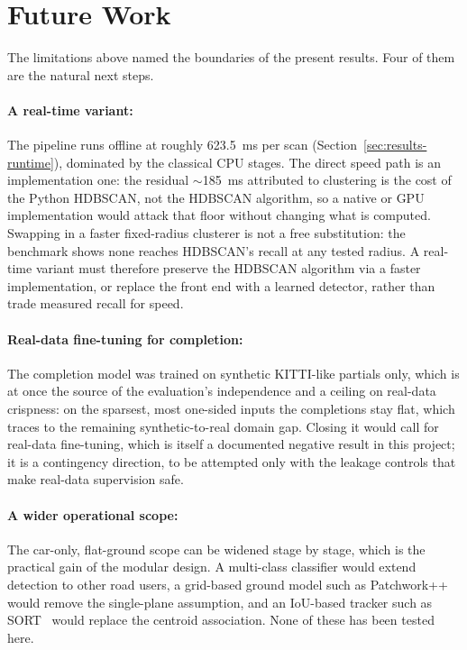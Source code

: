 \section{Future Work}
\label{sec:conclusion-future}

The limitations above named the boundaries of the present results. Four of them are the natural next
steps.

\paragraph{A real-time variant:} The pipeline runs offline at roughly
\SI{623.5}{\milli\second} per scan (Section~\ref{sec:results-runtime}), dominated by the
classical CPU stages. The direct speed path is an implementation one: the residual
$\sim$\SI{185}{\milli\second} attributed to clustering is the cost of the Python
HDBSCAN, not the HDBSCAN algorithm, so a native or GPU implementation would attack
that floor without changing what is computed. Swapping in a faster fixed-radius clusterer is
not a free substitution: the benchmark shows none reaches HDBSCAN's recall at any tested
radius. A real-time variant must therefore preserve the HDBSCAN algorithm via a faster
implementation, or replace the front end with a learned detector, rather than trade measured
recall for speed.

\paragraph{Real-data fine-tuning for completion:} The completion model was trained on
synthetic KITTI-like partials only, which is at once the source of the evaluation's
independence and a ceiling on real-data crispness: on the sparsest, most one-sided inputs the
completions stay flat, which traces to the remaining synthetic-to-real
domain gap. Closing it would call for real-data fine-tuning, which is itself a documented
negative result in this project; it is a contingency
direction, to be attempted only with the leakage controls that make real-data supervision
safe.

\paragraph{A wider operational scope:} The car-only, flat-ground scope can be widened stage by
stage, which is the practical gain of the modular design. A multi-class classifier would
extend detection to other road users, a grid-based ground model such as
Patchwork++~\cite{lee2022patchworkpp} would remove the single-plane assumption, and an
IoU-based tracker such as SORT~\cite{bewley2016sort} would replace the centroid association.
None of these has been tested here.

